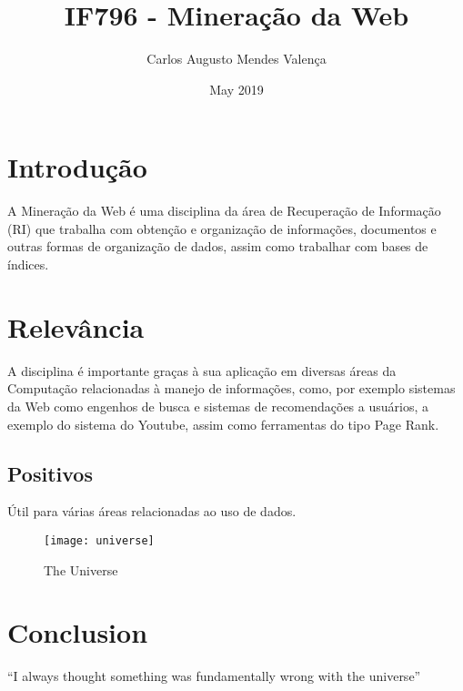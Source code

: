 \documentclass{article}
\title{IF796 - Mineração da Web}
\author{Carlos Augusto Mendes Valença}
\date{May 2019}
\begin{document}
\maketitle

\section{Introdução}
A Mineração da Web é uma disciplina da área de Recuperação de Informação (RI) que trabalha com obtenção e organização de informações, documentos e outras formas de organização de dados, assim como trabalhar com bases de índices. 

\section{Relevância}
A disciplina é importante graças à sua aplicação em diversas áreas da Computação relacionadas à manejo de informações, como, por exemplo sistemas da Web como engenhos de busca e sistemas de recomendações a usuários, a exemplo do sistema do Youtube, assim como ferramentas do tipo Page Rank. 
\subsection{Positivos}
\item Útil para várias áreas relacionadas ao uso de dados.


\begin{figure}[h!]
\centering
\texttt{[image: universe]}
\caption{The Universe}
\label{fig:universe}
\end{figure}

\section{Conclusion}
``I always thought something was fundamentally wrong with the universe'' \citep{adams1995hitchhiker}



\end{document}
